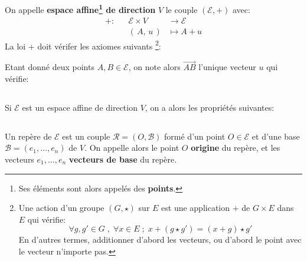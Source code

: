 \subsection*{}
On appelle \textbf{espace affine\footnote[1]{Ses éléments sont alors appelés des \textbf{points}.} de direction} \(V\) le couple \((\mathscr{E}, +)\) avec:
\[
   \begin{aligned}
      + : &&\mathscr{E} \times V &\longrightarrow \mathscr{E}\\
      &&(\,A, \, u\,) &\longmapsto A + u
   \end{aligned}
\]
La loi + doit vérifer les axiomes suivants 
\footnote[2]{Une action d'un groupe \((G, \star)\) sur \(E\) est une application \(+\) de \(G \times E \) dans \(E\) qui vérifie: \[
   \forall g, g' \in G  \; , \; \forall x \in E \; ; \; x + (g \star g') = (x + g) \star g'
\] \hspace{15pt} En d'autres termes, additionner d'abord les vecteurs, ou d'abord le point avec le vecteur n'importe pas.}:

Etant donné deux points \(A, B \in \mathscr{E}\), on note alors \(\overrightarrow{AB}\) l'unique vecteur \(u\) qui vérifie:

\subsection*{}
Si \(\mathscr{E}\) est un espace affine de direction \(V\), on a alors les propriétés suivantes:

\subsection*{}
Un repère de \(\mathscr{E}\) est un couple \(\mathscr{R} = (O, \mathscr{B})\) formé d'un point \(O \in \mathscr{E}\) et d'une base \(\mathscr{B} = (e_1, \ldots, e_n)\) de \(V\). On appelle alors le point \(O\) \textbf{origine} du repère, et les vecteurs \(e_1, \ldots, e_n\) \textbf{vecteurs de base} du repère.\<

